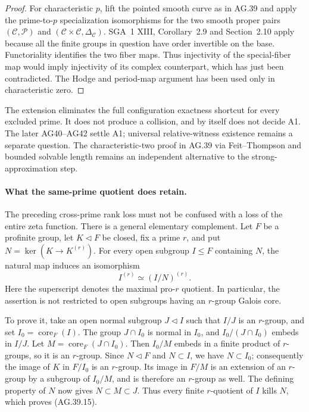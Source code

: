 \begin{proof}
For characteristic \(p\), lift the pointed smooth curve
as in AG.39 and apply the prime-to-\(p\) specialization
isomorphisms for the two smooth proper pairs
\((\mathcal C,\mathcal P)\) and
\((\mathcal C\times\mathcal C,\Delta_{\mathcal C})\).
SGA~1 XIII, Corollary~2.9 and Section~2.10 apply because
all the finite groups in question have order invertible
on the base. Functoriality identifies the two fiber maps.
Thus injectivity of the special-fiber map would imply
injectivity of its complex counterpart, which has just
been contradicted. The Hodge and period-map argument has
been used only in characteristic zero.
\end{proof}

The extension eliminates the full configuration exactness
shortcut for every excluded prime. It does not produce a
collision, and by itself does not decide A1.
The later AG40--AG42 settle A1; universal relative-witness
existence remains a separate question. The characteristic-two proof in AG.39
via Feit--Thompson and bounded solvable length remains an
independent alternative to the strong-approximation step.

\paragraph{What the same-prime quotient does retain.}
The preceding cross-prime rank loss must not be confused
with a loss of the entire zeta function. There is a general
elementary complement. Let \(F\) be a profinite group,
let \(K\triangleleft F\) be closed, fix a prime \(r\),
and put \(N=\ker(K\to K^{(r)})\). For every open
subgroup \(I\leq F\) containing \(N\), the natural map
induces an isomorphism
\[
                         I^{(r)}\simeq (I/N)^{(r)}.
                                                        \tag{AG.39.15}
\]
Here the superscript denotes the maximal pro-\(r\)
quotient. In particular, the assertion is not restricted
to open subgroups having an \(r\)-group Galois core.

To prove it, take an open normal subgroup \(J\triangleleft I\)
such that \(I/J\) is an \(r\)-group, and set
\(I_0=\operatorname{core}_F(I)\).
The group \(J\cap I_0\) is normal in \(I_0\), and
\(I_0/(J\cap I_0)\) embeds in \(I/J\).
Let \(M=\operatorname{core}_F(J\cap I_0)\).
Then \(I_0/M\) embeds in a finite product of
\(r\)-groups, so it is an \(r\)-group. Since
\(N\triangleleft F\) and \(N\subset I\), we have
\(N\subset I_0\); consequently the image of \(K\)
in \(F/I_0\) is an \(r\)-group. Its image in
\(F/M\) is an extension of an \(r\)-group by a
subgroup of \(I_0/M\), and is therefore an
\(r\)-group as well. The defining property of \(N\)
now gives \(N\subset M\subset J\). Thus every
finite \(r\)-quotient of \(I\) kills \(N\),
which proves (AG.39.15).

